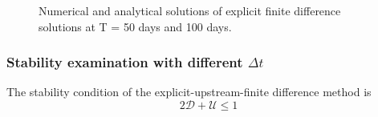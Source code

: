 \begin{figure}[!htbp]
    \centering
    \qquad
    \caption{Numerical and analytical solutions of explicit finite difference solutions at T = 50 days and 100 days.}
    \label{fig:2}
\end{figure}

\subsubsection{Stability examination with different $\Delta t$}
The stability condition of the explicit-upstream-finite difference method is
\begin{equation}
  \label{eq:stable}
  2\mathcal{D}+\mathcal{U} \leq 1
\end{equation}

